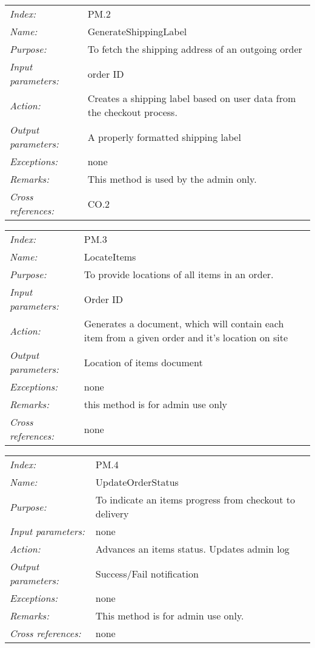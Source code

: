 \documentclass[10pt,letter]{article}
\begin{document}
\begin{tabularx}{\textwidth}{l X}
    \it{Index:} & PM.2 \\
    \it{Name:} &  GenerateShippingLabel\\
    \it{Purpose:} & To fetch the shipping address of an outgoing order \\
    \it{Input parameters:} & order ID \\
    \it{Action:} & Creates a shipping label based on user data from the checkout process. \\
    \it{Output parameters:} & A properly formatted shipping label\\
    \it{Exceptions:} & none \\
    \it{Remarks:} & This method is used by the admin only.\\
    \it{Cross references:} & CO.2\\
    \hline
\end{tabularx}
\begin{tabularx}{\textwidth}{l X}
    \it{Index:} &  PM.3\\
    \it{Name:} & LocateItems \\
    \it{Purpose:} & To provide locations of all items in an order. \\
    \it{Input parameters:} & Order ID  \\
    \it{Action:} & Generates a document, which will contain each item from a given order and it's location on site\\
    \it{Output parameters:} & Location of items document\\
    \it{Exceptions:} & none\\
    \it{Remarks:} & this method is for admin use only\\
    \it{Cross references:} & none\\
    \hline
\end{tabularx}

\begin{tabularx}{\textwidth}{l X}
    \it{Index:} & PM.4 \\
    \it{Name:} &  UpdateOrderStatus\\
    \it{Purpose:} &  To indicate an items progress from checkout to delivery\\
    \it{Input parameters:} & none \\
    \it{Action:} & Advances an items status. Updates admin log\\
    \it{Output parameters:} & Success/Fail notification\\
    \it{Exceptions:} & none\\
    \it{Remarks:} & This method is for admin use only.\\
    \it{Cross references:} & none\\
    \hline
\end{tabularx}
\end{document}
